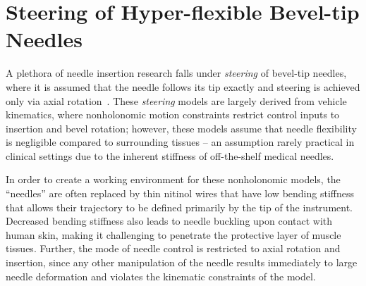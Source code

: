 \section{Steering of Hyper-flexible Bevel-tip Needles}
\label{sec:steering-of-hyperflexible-bevel-tip-needles}

A plethora of needle insertion research falls under \textit{steering} of bevel-tip needles, where it is assumed that the needle follows its tip exactly and steering is achieved only via axial rotation~\parencite{liReviewTechniquesUsed2022}. These \textit{steering} models are largely derived from vehicle kinematics, where nonholonomic motion constraints restrict control inputs to insertion and bevel rotation; however, these models assume that needle flexibility is negligible compared to surrounding tissues -- an assumption rarely practical in clinical settings due to the inherent stiffness of off-the-shelf medical needles.

In order to create a working environment for these nonholonomic models, the ``needles'' are often replaced by thin nitinol wires that have low bending stiffness that allows their trajectory to be defined primarily by the tip of the instrument. Decreased bending stiffness also leads to needle buckling upon contact with human skin, making it challenging to penetrate the protective layer of muscle tissues. Further, the mode of needle control is restricted to axial rotation and insertion, since any other manipulation of the needle results immediately to large needle deformation and violates the kinematic constraints of the model.




